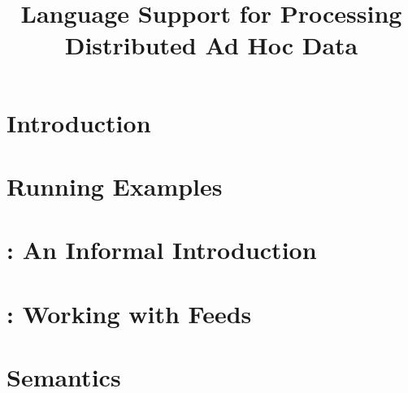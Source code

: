 \documentclass[nocopyrightspace]{sigplanconf}
\begin{document}
\title{Language Support for Processing Distributed Ad Hoc Data}





\maketitle{}

\begin{abstract}  

\end{abstract}

\section {Introduction}
\label{sec:intro}


\section{Running Examples}
\label{sec:examples}


\section{\padsd{}: An Informal Introduction}
\label{sec:informal}


\section{\padsd{}:  Working with Feeds}
\label{sec:programming}


\section{\padsd{} Semantics}
\label{sec:semantics}

\end{document}
